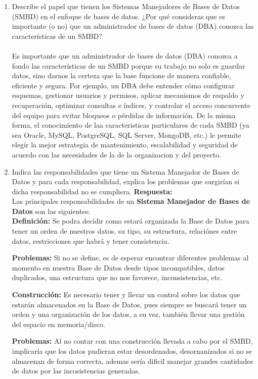 \documentclass[12pt]{report}
\begin{document}
\begin{enumerate}[label=\textbf{\arabic*.}, leftmargin=*]
\begin{enumerate}[label=\textbf{\alph*.}, leftmargin=*, itemsep=1.0em]
\item Describe el papel que tienen los Sistemas Manejadores de Bases de Datos (SMBD) en el enfoque de bases de datos. ¿Por qu\'e consideras que es importante (o no) que un administrador de bases de datos (DBA) conozca las caracter\'isticas de un SMBD?\\
\\
    Es importante que un administrador de bases de datos (DBA) conozca a fondo las características de un SMBD porque su trabajo no solo es guardar datos, sino darnos la certeza que la base funcione de manera confiable, eficiente y segura. Por ejemplo, un DBA debe entender cómo configurar esquemas, gestionar usuarios y permisos, aplicar mecanismos de respaldo y recuperación, optimizar consultas e índices, y controlar el acceso concurrente del equipo para evitar bloqueos o pérdidas de información. De la misma forma, el conocimiento de laa caracteristicas particulares de cada SMBD (ya sea Oracle, MySQL, PostgreSQL, SQL Server, MongoDB, etc.) le permite elegir la mejor estrategia de mantenimiento, escalabilidad y seguridad de acuerdo con las necesidades de la de la organizacion y del proyecto.




\item Indica las responsabilidades que tiene un Sistema Manejador de Bases de Datos y para cada responsabilidad, explica los problemas que surgir\'ian si dicha responsabilidad no se cumpliera.
\textbf{Respuesta:}\\
Las principales responsabilidades de un \textbf{Sistema Manejador de Bases de Datos} son las siguientes:\\
\textbf{Definición:} Se podra decidir como estará organizada la Base de Datos para tener un orden de nuestros datos, su tipo, su estructura, relaciónes entre datos, restricciones que habrá y tener consistencia.

\hspace{0.3cm}\textbf{Problemas:} Si no se define, es de esperar encontrar diferentes problemas al momento en nuestra Base de Datos desde tipos incompatibles, datos duplicados, una estructura que no nos favorece, inconsistencias, etc.
    
    
\textbf{Construcción:}
Es necesario tener y llevar un control sobre los datos que estarán almacenados en la Base de Datos, pues siempre se buscará tener un orden y una organización de los datos, a su vez, también llevar una gestión del espacio en memoria/disco.

\hspace{0.3cm}\textbf{Problemas:} 
Al no contar con una construcción llevada a cabo por el SMBD, implicaría que los datos pudieran estar desordenados, desornanizados si no se almacenan de forma correcta, ademas sería dificil manejar grandes cantidades de datos por las incosistencias generadas. 


\end{enumerate}
\end{enumerate}
\end{document}
